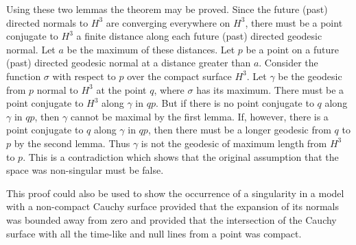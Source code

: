 Using these two lemmas the theorem may be proved. Since the future (past)
directed normals to $H^3$ are converging everywhere on $H^3$, there must be a
point conjugate to $H^3$ a finite distance along each future (past) directed
geodesic normal. Let $a$ be the maximum of these distances. Let $p$ be a point
on a future (past) directed geodesic normal at a distance greater than $a$.
Consider the function $\sigma$ with respect to $p$ over the compact surface
$H^3$. Let $\gamma$ be the geodesic from $p$ normal to $H^3$ at the point
$q$, where $\sigma$ has its maximum. There must be a point conjugate to $H^3$
along $\gamma$ in $qp$. But if there is no point conjugate to $q$ along
$\gamma$ in $qp$, then $\gamma$ cannot be maximal by the first lemma. If,
however, there is a point conjugate to $q$ along $\gamma$ in $qp$, then there
must be a longer geodesic from $q$ to $p$ by the second lemma. Thus $\gamma$
is not the geodesic of maximum length from $H^3$ to $p$. This is a
contradiction which shows that the original assumption that the space was
non-singular must be false.

This proof could also be used to show the occurrence of a singularity in a
model with a non-compact Cauchy surface provided that the expansion of its
normals was bounded away from zero and provided that the intersection of the
Cauchy surface with all the time-like and null lines from a point was compact.


\renewcommand{\bibname}{References}

